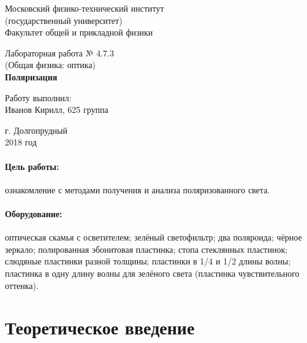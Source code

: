\documentclass[12pt]{kiarticle}
\begin{document}
	
	\begin{titlepage}
	\begin{center}
		\large 	Московский физико-технический институт \\
		(государственный университет) \\
		Факультет общей и прикладной физики \\
		\vspace{0.2cm}
		
		\vspace{4.5cm}
		Лабораторная работа № 4.7.3 \\ \vspace{0.2cm}
		\large (Общая физика: оптика) \\ \vspace{0.2cm}
		\LARGE \textbf{Поляризация}
	\end{center}
	\vspace{2.3cm} \large
	
	\begin{center}
		Работу выполнил: \\
		Иванов Кирилл,
		625 группа
		\vspace{10mm}		
		
	\end{center}
	
	\begin{center} \vspace{60mm}
		г. Долгопрудный \\
		2018 год
	\end{center}
\end{titlepage}
	
	\paragraph*{Цель работы:} ознакомление с методами получения и анализа поляризованного света.
	
	\paragraph*{Оборудование:} оптическая скамья с осветителем; зелёный светофильтр; два поляроида; чёрное зеркало; полированная эбонитовая пластинка; стопа стеклянных пластинок; слюдяные пластинки разной толщины; пластинки в 1/4 и 1/2 длины волны; пластинка в одну длину волны для зелёного света (пластинка чувствительного оттенка).
	
	\section{Теоретическое введение}
	
\end{document}
